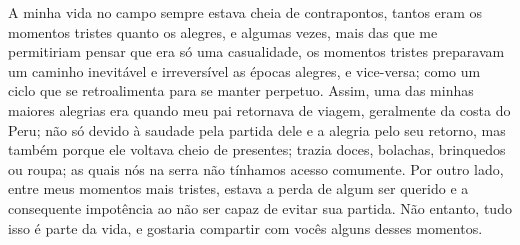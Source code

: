 A minha vida no campo sempre estava cheia de contrapontos, tantos eram os momentos tristes quanto os alegres, e algumas vezes, mais das que me permitiriam pensar que era só uma casualidade, os momentos tristes preparavam um caminho inevitável e irreversível as épocas alegres, e vice-versa; como um ciclo que se retroalimenta para se manter perpetuo. 
Assim, uma das minhas maiores alegrias era quando meu pai retornava de viagem, geralmente da costa do Peru; não só devido à saudade pela partida dele e a alegria pelo seu retorno, mas também porque ele voltava cheio de presentes; trazia doces, bolachas, brinquedos ou roupa; as quais nós na serra não tínhamos acesso comumente.
Por outro lado, entre meus momentos mais tristes, estava a perda de algum ser querido e a consequente impotência ao não ser capaz de evitar sua partida. 
Não entanto, tudo isso é parte da vida, e gostaria compartir com vocês alguns desses momentos.



